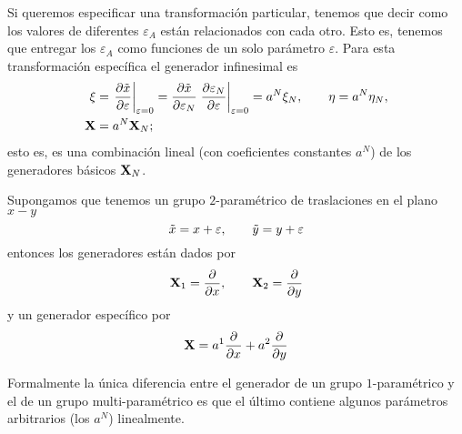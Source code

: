 Si queremos especificar una transformación particular, tenemos que decir como los valores de diferentes $\varepsilon_A$ están relacionados con cada otro. Esto es, tenemos que entregar los $\varepsilon_A$ como funciones de un solo parámetro $\varepsilon$. Para esta transformación específica el generador infinesimal es
\begin{align}
        \xi&=\eval{\pdv{\Tilde{x}}{\varepsilon}}_{\varepsilon=0}=\pdv{\Tilde{x}}{\varepsilon_N}\eval{\pdv{\varepsilon_N}{\varepsilon}}_{\varepsilon=0}=a^N\xi_N,\qquad \eta=a^N\eta_N,\\
        \vb{X}&=a^N\vb{X}_N;\label{2.51}
\end{align}
esto es, es una combinación lineal (con coeficientes constantes $a^N$) de los generadores básicos $\vb{X}_N$.

\begin{ejemplo}
    Supongamos que tenemos un grupo $2$-paramétrico de traslaciones en el plano $x-y$
    \begin{equation}
        \Tilde{x}=x+\varepsilon,\qquad \Tilde{y}=y+\varepsilon
    \end{equation}
    entonces los generadores están dados por
    \begin{equation}
        \vb{X}_1=\pdv{x},\qquad \vb{X}_2=\pdv{y}
    \end{equation}
    y un generador específico por
    \begin{equation}
        \vb{X}=a^1\pdv{x}+a^2\pdv{y}
    \end{equation}
\end{ejemplo}

Formalmente la única diferencia entre el generador de un grupo $1$-paramétrico y el de un grupo multi-paramétrico es que el último contiene algunos parámetros arbitrarios (los $a^N$) linealmente.
